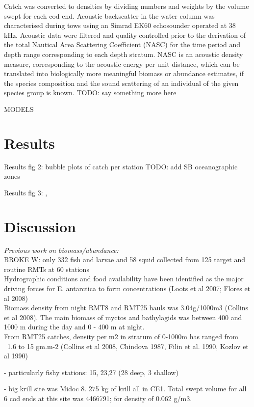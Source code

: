 \documentclass[12pt, fleqn]{article}
\begin{document}
{Catch was converted to densities by dividing numbers and weights by the volume swept for each cod end. Acoustic backscatter in the water column was characterised during tows using an Simrad EK60 echosounder operated at 38 kHz.
Acoustic data were filtered and quality controlled prior to the derivation of the total Nautical Area Scattering Coefficient (NASC) for the time period and depth range corresponding to each depth stratum. NASC is an acoustic density measure, corresponding to the acoustic energy per unit distance, which can be translated into biologically more meaningful biomass or abundance estimates, if the species composition and the sound scattering of an individual of the given species group is known.
TODO: say something more here

MODELS

\section{Results}

Results fig 2: bubble plots of catch per station
	TODO: add SB oceanographic zones

Results fig 3: ,

\section{Discussion}

\emph{Previous work on biomass/abundance:}\\
BROKE W: only 332 fish and larvae and 58 squid collected from 125 target and routine RMTs at 60 stations \citep{Vandeputte:2010}\\
Hydrographic conditions and food availability have been identified as the major driving forces for E. antarctica to form concentrations (Loots et al 2007; Flores et al 2008)\\
Biomass density from night RMT8 and RMT25 hauls was 3.04g/1000m3 (Collins et al 2008). The main biomass of myctos and bathylagids was between 400 and 1000 m during the day and 0 - 400 m at night. \\
From RMT25 catches, density per m2 in stratum of 0-1000m has ranged from ~1.6 to 15 gm.m-2 (Collins et al 2008, Chindova 1987, Filin et al. 1990, Kozlov et al 1990)


- particularly fishy stations: 15, 23,27 (28 deep, 3 shallow)

- big krill site was Midoc 8. 275 kg of krill all in CE1. Total swept volume for all 6 cod ends at this site was 4466791; for density of 0.062 g/m3.

}
\end{document}
